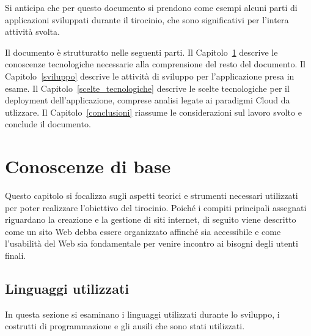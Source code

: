 \documentclass[12pt,a4paper]{article}
\begin{document}
Si anticipa che per questo documento si prendono come esempi alcuni parti di applicazioni sviluppati durante il tirocinio, che sono significativi per l'intera attività svolta.

Il documento è strutturatto nelle seguenti parti.
Il Capitolo~\ref{aspetti_teorici} descrive le conoscenze tecnologiche necessarie alla comprensione del resto del documento.
%
Il Capitolo~\ref{sviluppo} descrive le attività di sviluppo per l'applicazione presa in esame.
%
Il Capitolo~\ref{scelte_tecnologiche} descrive le scelte tecnologiche per il deployment dell'applicazione, comprese analisi legate ai paradigmi Cloud da utlizzare.
%
Il Capitolo~\ref{conclusioni} riassume le considerazioni sul lavoro svolto e conclude il documento.
\clearpage

\section{Conoscenze di base}
\label{aspetti_teorici}
Questo capitolo si focalizza sugli aspetti teorici e strumenti necessari utilizzati per poter realizzare l’obiettivo del tirocinio. Poiché i compiti principali assegnati riguardano la creazione e la gestione di siti internet, di seguito viene descritto come un sito Web debba essere organizzato affinché sia accessibile e come l’usabilità del Web sia fondamentale per venire incontro ai bisogni degli utenti finali.

\subsection{Linguaggi utilizzati}
In questa sezione si esaminano i linguaggi utilizzati durante lo sviluppo, i costrutti di programmazione e gli ausili che sono stati utilizzati.
\end{document}
